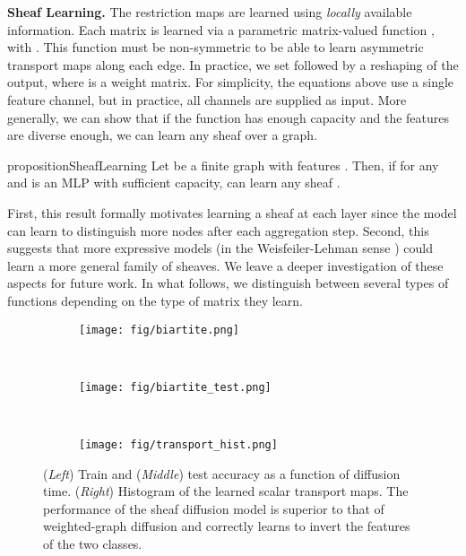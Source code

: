 \documentclass{article}
\begin{document}
\textbf{Sheaf Learning. } The restriction maps are learned using \emph{locally} available information. Each  matrix  is learned via a parametric matrix-valued function , with . 
This function must be non-symmetric to be able to learn asymmetric transport maps along each edge. 
In practice, we set  followed by a reshaping of the output, where  is a weight matrix. For simplicity, the equations above use a single feature channel, but in practice, all channels are supplied as input. More generally, we can show that if the function  has enough capacity and the features are diverse enough, we can learn any sheaf over a graph. 

\begin{restatable}{proposition}{SheafLearning}\label{prop:sheaf_learning}
Let  be a finite graph with features . Then, if  for any  and  is an MLP with sufficient capacity,  can learn any sheaf . 
\end{restatable}

First, this result formally motivates learning a sheaf at each layer since the model can learn to distinguish more nodes after each aggregation step. Second, this suggests that more expressive models (in the Weisfeiler-Lehman sense \citep{gin, morris2019weisfeiler, pmlr-v139-bodnar21a, bodnar2021b}) could learn a more general family of sheaves. We leave a deeper investigation of these aspects for future work. In what follows, we distinguish between several types of functions  depending on the type of matrix they learn.

\begin{figure}[t]
    \centering
    \begin{subfigure}[b]{0.3\columnwidth}
        \centering
        \texttt{[image: fig/biartite.png]}
    \end{subfigure}
    ~
    \begin{subfigure}[b]{0.3\columnwidth}
        \centering
        \texttt{[image: fig/biartite\_test.png]}
    \end{subfigure}
    ~
    \begin{subfigure}[b]{0.3\columnwidth}
        \centering
        \texttt{[image: fig/transport\_hist.png]}
    \end{subfigure}
    \caption{(\textit{Left}) Train and (\textit{Middle}) test accuracy as a function of diffusion time. (\textit{Right}) Histogram of the learned scalar transport maps. The performance of the sheaf diffusion model is superior to that of weighted-graph diffusion and correctly learns to invert the features of the two classes.}
    \label{fig:bipartite_graph}
    \vspace{-12pt}
\end{figure}
\end{document}
